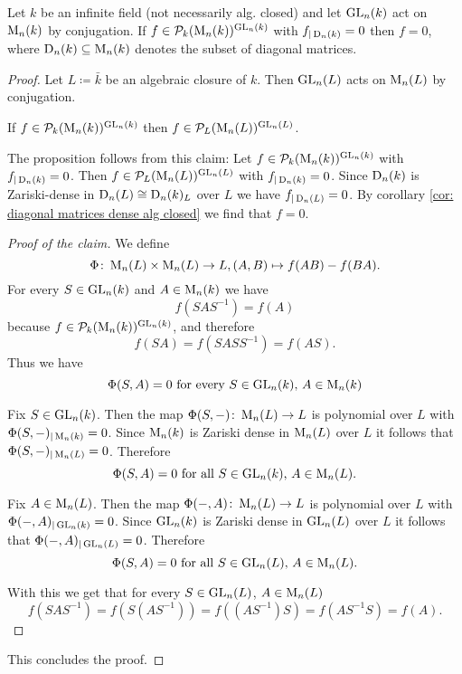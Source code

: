\begin{prop}
 Let $k$ be an infinite field (not necessarily alg. closed) and let $\operatorname{GL}_n(k)$ act on $\operatorname{M}_n(k)$ by conjugation. If $f \in \mathcal{P}_k(\operatorname{M}_n(k))^{\operatorname{GL}_n(k)}$ with $f_{|\operatorname{D}_n(k)} = 0$ then $f = 0$, where $\operatorname{D}_n(k) \subseteq \operatorname{M}_n(k)$ denotes the subset of diagonal matrices.
\end{prop}
\begin{proof}
 Let $L \coloneqq \bar{k}$ be an algebraic closure of $k$. Then $\operatorname{GL}_n(L)$ acts on $\operatorname{M}_n(L)$ by conjugation.
 
 \begin{claim}
  If $f \in \mathcal{P}_k(\operatorname{M}_n(k))^{\operatorname{GL}_n(k)}$ then $f \in \mathcal{P}_L(\operatorname{M}_n(L))^{\operatorname{GL}_n(L)}$.
 \end{claim}
 
 The proposition follows from this claim: Let $f \in \mathcal{P}_k(\operatorname{M}_n(k))^{\operatorname{GL}_n(k)}$ with $f_{|\operatorname{D}_n(k)} = 0$. Then $f \in \mathcal{P}_L(\operatorname{M}_n(L))^{\operatorname{GL}_n(L)}$ with $f_{|\operatorname{D}_n(k)} = 0$. Since $\operatorname{D}_n(k)$ is Zariski-dense in $\operatorname{D}_n(L) \cong \operatorname{D}_n(k)_L$ over $L$ we have $f_{|\operatorname{D}_n(L)} = 0$. By corollary \ref{cor: diagonal matrices dense alg closed} we find that $f = 0$.
 
 \begin{proof}[Proof of the claim]
  We define
  \[
   \Phi \colon \operatorname{M}_n(L) \times \operatorname{M}_n(L) \to L, (A,B) \mapsto f(AB)-f(BA).
  \]
  For every $S \in \operatorname{GL}_n(k)$ and $A \in \operatorname{M}_n(k)$ we have
  \[
   f\left( SAS^{-1} \right) = f(A)
  \]
  because $f \in \mathcal{P}_k(\operatorname{M}_n(k))^{\operatorname{GL}_n(k)}$, and therefore
  \[
   f(SA) = f\left(SASS^{-1}\right) = f(AS).
  \]
  Thus we have
  \[
   \Phi(S,A) = 0 \text{ for every } S \in \operatorname{GL}_n(k)\text{, }A \in \operatorname{M}_n(k)
  \]
  
  Fix $S \in \operatorname{GL}_n(k)$. Then the map $\Phi(S, -) \colon \operatorname{M}_n(L) \to L$ is polynomial over $L$ with $\Phi(S,-)_{|\operatorname{M}_n(k)} = 0$. Since $\operatorname{M}_n(k)$ is Zariski dense in $\operatorname{M}_n(L)$ over $L$ it follows that $\Phi(S,-)_{|\operatorname{M}_n(L)} = 0$. Therefore
  \[
   \Phi(S,A) = 0 \text{ for all } S \in \operatorname{GL}_n(k)\text{, }A \in \operatorname{M}_n(L).
  \]
  
  Fix $A \in \operatorname{M}_n(L)$. Then the map $\Phi(-,A) \colon \operatorname{M}_n(L) \to L$ is polynomial over $L$ with $\Phi(-,A)_{|\operatorname{GL}_n(k)} = 0$. Since $\operatorname{GL}_n(k)$ is Zariski dense in $\operatorname{GL}_n(L)$ over $L$ it follows that $\Phi(-,A)_{|\operatorname{GL}_n(L)} = 0$. Therefore
  \[
   \Phi(S,A) = 0 \text{ for all } S \in \operatorname{GL}_n(L)\text{, }A \in \operatorname{M}_n(L).
  \]
  
  With this we get that for every $S \in \operatorname{GL}_n(L)$, $A \in \operatorname{M}_n(L)$
  \[
   f\left(SAS^{-1}\right)
   = f\left(S\left(AS^{-1}\right)\right)
   = f\left(\left(AS^{-1}\right)S\right)
   = f\left(AS^{-1}S\right)
   = f(A).
  \]
 \end{proof}
 
 This concludes the proof.
\end{proof}





